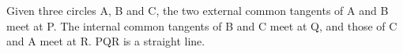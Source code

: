  Given three circles A, B and C, the two external common tangents
of A and B meet at P. The internal common tangents of B and C meet at
Q, and those of C and A meet at R. PQR is a straight line.
